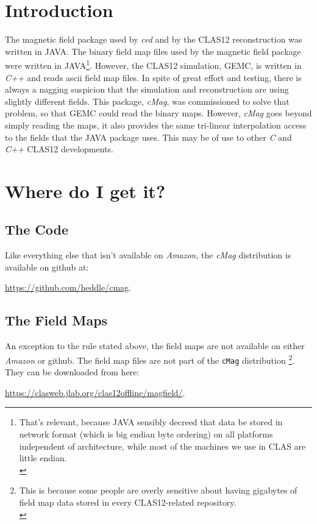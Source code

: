 \documentclass{article}
\begin{document}
\tableofcontents
\newpage

\section {Introduction}
The magnetic field package used by \textit{ced} and by the CLAS12 reconstruction was written in JAVA. The  binary field map files used by the magnetic field package were written in JAVA\footnote{That's relevant, because JAVA sensibly decreed that data be stored in network format (which is big endian byte ordering) on all platforms independent of architecture, while most of the machines we use in CLAS are little endian.\\}. However, the CLAS12 simulation, GEMC, is written in \textit{C++} and reads ascii field map files. In spite of great effort and testing, there is always a nagging suspicion that the simulation and reconstruction are using slightly different fields. This package, \textit{cMag}, was commissioned to solve that problem, so that GEMC could read the binary maps. However, \textit{cMag} goes beyond simply reading the maps, it also provides the same tri-linear interpolation access to the fields that the JAVA package uses. This may be of use to other \textit{C} and \textit{C++} CLAS12 developments. 

\section {Where do I get it?}
\subsection {The Code}
Like everything else that isn't available on \textit{Amazon}, the \textit{cMag} distribution is available on github at:

\url{https://github.com/heddle/cmag}.

\subsection {The Field Maps}
An exception to the rule stated above, the field maps are not available on either \textit{Amazon} or github. The field map files are not part of the \texttt{cMag} distribution \footnote{This is because some people are overly sensitive about having gigabytes of field map data stored in every CLAS12-related repository.\\}. They can be downloaded from here:\

 \url{https://clasweb.jlab.org/clas12offline/magfield/}.
\end{document}

